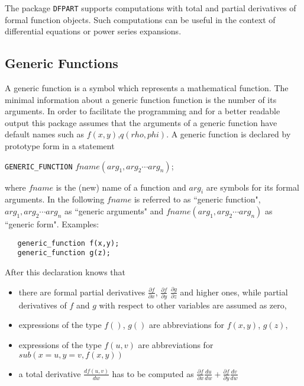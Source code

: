 
The package {\tt DFPART} supports computations with total and partial
derivatives of formal function objects. Such computations can
be useful in the context of differential equations or
power series expansions.

\subsection{Generic Functions}

A generic function is a symbol which represents a mathematical
function. The minimal information about a generic function 
function is the number of its arguments. In order to facilitate
the programming and for a better readable output this package
assumes that the arguments of a generic function have default
names such as $f(x,y)$,$q(rho,phi)$. 
A generic function is declared by prototype form in a statement

\vspace{.1in}
 {\tt GENERIC\_FUNCTION} $fname(arg_1,arg_2\cdots arg_n)$;
\vspace{.1in}

\noindent
where $fname$ is the (new) name of a function and $arg_i$ are
symbols for its formal arguments. 
In the following $fname$ is referred to as ``generic function",
$arg_1,arg_2\cdots arg_n$ as ``generic arguments" and
$fname(arg_1,arg_2\cdots arg_n)$ as ``generic form".
Examples:

\begin{verbatim}
   generic_function f(x,y);
   generic_function g(z);
\end{verbatim}


After this declaration {\REDUCE} knows that 
\begin{itemize}
\item there are formal partial derivatives $\frac{\partial f}{\partial x}$,
$\frac{\partial f}{\partial y}$ $\frac{\partial g}{\partial z}$
and higher ones, while partial derivatives of $f$ and $g$
with respect to other variables are assumed as zero,
\item expressions of the type $f()$, $g()$ are abbreviations for
$f(x,y)$, $g(z)$,
\item expressions of the type $f(u,v)$ are abbreviations for\\
$sub(x=u,y=v,f(x,y))$
\item a total derivative $\frac{d f(u,v)}{d w}$ has to be computed
as $\frac{\partial f}{\partial x} \frac{d u}{d w} +
    \frac{\partial f}{\partial y} \frac{d v}{d w}$
\end{itemize}

